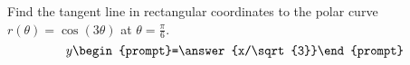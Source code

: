 \documentclass{ximera}
\author{Gregory Hartman \and Matthew Carr}
\begin{document}
\begin{exercise}





Find the tangent line in rectangular coordinates to the polar curve $r(\theta)=\cos(3\theta)$ at $\theta=\frac{\pi}{6}$. 
 \[
y\begin{prompt}=\answer{x/\sqrt{3}}\end{prompt}
 \]      
 
\end{exercise}
\end{document}
